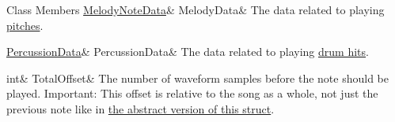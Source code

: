 \begin{DoxyFields}{Class Members}
\mbox{\label{group___song_structs_a68c8aba7d8d48bc0b88c8d4fc0dcc0ea}} 
\hyperlink{group___song_structs_struct_song_1_1_melody_note_data}{MelodyNoteData}&
MelodyData&
The data related to playing \hyperlink{group___music_structs_struct_music_1_1_melody_note}{pitches}. \\
\hline

\mbox{\label{group___song_structs_a98cc55f2de1d8e8015e5bd2cda2d48ce}} 
\hyperlink{group___song_structs_struct_song_1_1_percussion_data}{PercussionData}&
PercussionData&
The data related to playing \hyperlink{group___music_structs_struct_music_1_1_percussion_note}{drum hits}. \\
\hline

\mbox{\label{group___song_structs_a9a0f4830f464d3c7e7f4f156ce490cec}} 
int&
TotalOffset&
The number of waveform samples before the note should be played. Important\+: This offset is relative to the song as a whole, not just the previous note like in \hyperlink{group___music_structs_struct_music_1_1_combined_note}{the abstract version of this struct}. \\
\hline

\end{DoxyFields}
